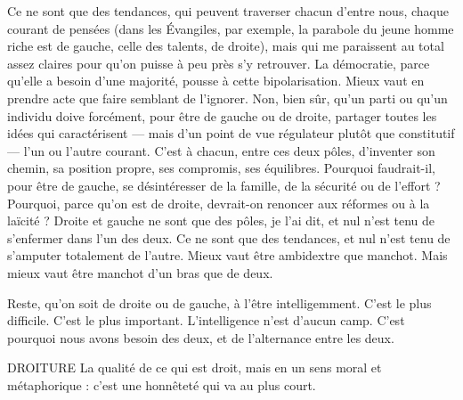 Ce ne sont que des tendances, qui peuvent traverser chacun d’entre nous,
chaque courant de pensées (dans les Évangiles, par exemple, la parabole du
jeune homme riche est de gauche, celle des talents, de droite), mais qui me
paraissent au total assez claires pour qu’on puisse à peu près s’y retrouver. La
démocratie, parce qu’elle a besoin d’une majorité, pousse à cette bipolarisation.
Mieux vaut en prendre acte que faire semblant de l’ignorer. Non, bien sûr,
qu’un parti ou qu’un individu doive forcément, pour être de gauche ou de
droite, partager toutes les idées qui caractérisent — mais d’un point de vue régulateur
plutôt que constitutif — l’un ou l’autre courant. C’est à chacun, entre ces
deux pôles, d'inventer son chemin, sa position propre, ses compromis, ses équilibres.
Pourquoi faudrait-il, pour être de gauche, se désintéresser de la famille,
de la sécurité ou de l'effort ? Pourquoi, parce qu’on est de droite, devrait-on
renoncer aux réformes ou à la laïcité ? Droite et gauche ne sont que des pôles,
je l’ai dit, et nul n’est tenu de s’enfermer dans l’un des deux. Ce ne sont que des
tendances, et nul n’est tenu de s’amputer totalement de l’autre. Mieux vaut être
ambidextre que manchot. Mais mieux vaut être manchot d’un bras que de
deux.

Reste, qu’on soit de droite ou de gauche, à l’être intelligemment. C’est le
plus difficile. C’est le plus important. L'intelligence n’est d’aucun camp. C’est
pourquoi nous avons besoin des deux, et de l’alternance entre les deux.

DROITURE La qualité de ce qui est droit, mais en un sens moral et métaphorique :
c’est une honnêteté qui va au plus court.

